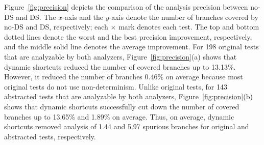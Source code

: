 Figure~\ref{fig:precision} depicts the comparison of the analysis
precision between no-DS and DS.  The $x$-axis and the $y$-axis denote
the number of branches covered by no-DS and DS, respectively;
each $\times$ mark denotes each test.  The top and bottom dotted lines
denote the worst and the best precision improvement, respectively, and
the middle solid line denotes the average improvement.
For 198 original tests that are analyzable by both analyzers,
Figure~\ref{fig:precision}(a) shows that dynamic shortcuts
reduced the number of covered branches up to 13.13\%. However, it reduced
the number of branches 0.46\% on average because most original tests
do not use non-determinism. Unlike original tests, for 143
abstracted tests that are analyzable by both analyzers,
Figure~\ref{fig:precision}(b) shows that dynamic shortcuts successfully cut down
the number of covered branches up to 13.65\% and 1.89\% on average.
Thus, on average, dynamic shortcuts removed analysis of 1.44 and 5.97 spurious branches
for original and abstracted tests, respectively.

